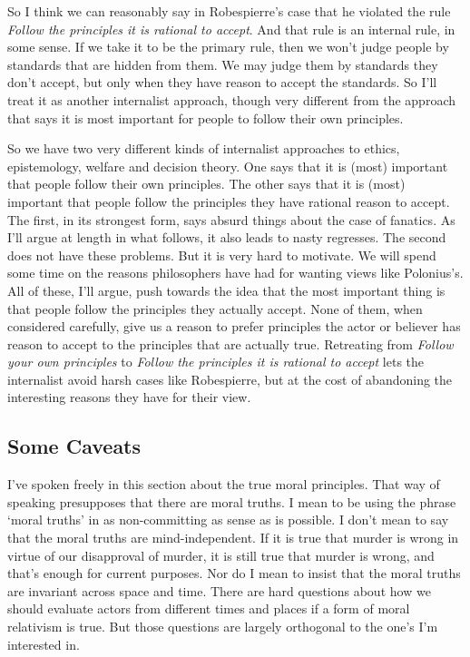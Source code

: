 \documentclass[
  10pt,
  letterpaper,
  twoside]{scrbook}
\begin{document}
So I think we can reasonably say in {Robespierre}'s case that he
violated the rule \emph{Follow the principles it is rational to accept}.
And that rule is an internal rule, in some sense. If we take it to be
the primary rule, then we won't judge people by standards that are
hidden from them. We may judge them by standards they don't accept, but
only when they have reason to accept the standards. So I'll treat it as
another internalist approach, though very different from the approach
that says it is most important for people to follow their own
principles.

So we have two very different kinds of internalist approaches to ethics,
epistemology, welfare and decision theory. One says that it is (most)
important that people follow their own principles. The other says that
it is (most) important that people follow the principles they have
rational reason to accept. The first, in its strongest form, says absurd
things about the case of fanatics. As I'll argue at length in what
follows, it also leads to nasty regresses. The second does not have
these problems. But it is very hard to motivate. We will spend some time
on the reasons philosophers have had for wanting views like Polonius's.
All of these, I'll argue, push towards the idea that the most important
thing is that people follow the principles they actually accept. None of
them, when considered carefully, give us a reason to prefer principles
the actor or believer has reason to accept to the principles that are
actually true. Retreating from \emph{Follow your own principles} to
\emph{Follow the principles it is rational to accept} lets the
internalist avoid harsh cases like {Robespierre}, but at the cost of
abandoning the interesting reasons they have for their view.

\subsection{Some Caveats}\label{somecaveats}

I've spoken freely in this section about the true moral principles. That
way of speaking presupposes that there are moral truths. I mean to be
using the phrase `moral truths' in as non-committing as sense as is
possible. I don't mean to say that the moral truths are
mind-independent. If it is true that murder is wrong in virtue of our
disapproval of murder, it is still true that murder is wrong, and that's
enough for current purposes. Nor do I mean to insist that the moral
truths are invariant across space and time. There are hard questions
about how we should evaluate actors from different times and places if a
form of moral relativism is true. But those questions are largely
orthogonal to the one's I'm interested in.
\end{document}

